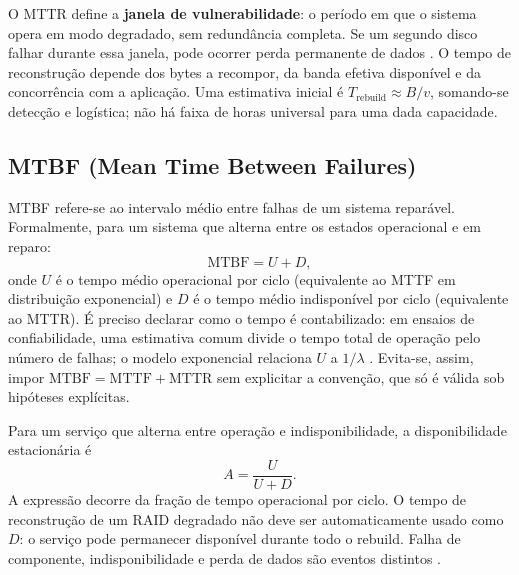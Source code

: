\documentclass[titlepage]{article}
\begin{document}
O MTTR define a \textbf{janela de vulnerabilidade}: o período em que o sistema opera em modo degradado, sem redundância completa. Se um segundo disco falhar durante essa janela, pode ocorrer perda permanente de dados \cite{silberschatz2020}. O tempo de reconstrução depende dos bytes a recompor, da banda efetiva disponível e da concorrência com a aplicação. Uma estimativa inicial é $T_{\mathrm{rebuild}}\approx B/v$, somando-se detecção e logística; não há faixa de horas universal para uma dada capacidade.

\subsection{MTBF (Mean Time Between Failures)}
MTBF refere-se ao intervalo médio entre falhas de um sistema reparável. Formalmente, para um sistema que alterna entre os estados operacional e em reparo:
\begin{equation}
    \mathrm{MTBF} = U + D,
    \label{eq:mtbf}
\end{equation}
onde $U$ é o tempo médio operacional por ciclo (equivalente ao MTTF em distribuição exponencial) e $D$ é o tempo médio indisponível por ciclo (equivalente ao MTTR). É preciso declarar como o tempo é contabilizado: em ensaios de confiabilidade, uma estimativa comum divide o tempo total de operação pelo número de falhas; o modelo exponencial relaciona $U$ a $1/\lambda$ \cite{nist_mtbf}. Evita-se, assim, impor $\mathrm{MTBF}=\mathrm{MTTF}+\mathrm{MTTR}$ sem explicitar a convenção, que só é válida sob hipóteses explícitas.

Para um serviço que alterna entre operação e indisponibilidade, a disponibilidade estacionária é
\[
A=\frac{U}{U+D}.
\]
A expressão decorre da fração de tempo operacional por ciclo. O tempo de reconstrução de um RAID degradado não deve ser automaticamente usado como $D$: o serviço pode permanecer disponível durante todo o rebuild. Falha de componente, indisponibilidade e perda de dados são eventos distintos \cite{snia_dictionary}.
\end{document}
